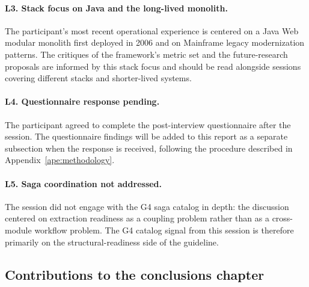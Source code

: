 \paragraph*{L3. Stack focus on Java and the long-lived monolith.} The participant's most recent operational experience is centered on a Java Web modular monolith first deployed in 2006 and on Mainframe legacy modernization patterns. The critiques of the framework's metric set and the future-research proposals are informed by this stack focus and should be read alongside sessions covering different stacks and shorter-lived systems.

\paragraph*{L4. Questionnaire response pending.} The participant agreed to complete the post-interview questionnaire after the session. The questionnaire findings will be added to this report as a separate subsection when the response is received, following the procedure described in Appendix~\ref{ape:methodology}.

\paragraph*{L5. Saga coordination not addressed.} The session did not engage with the G4 saga catalog in depth: the discussion centered on extraction readiness as a coupling problem rather than as a cross-module workflow problem. The G4 catalog signal from this session is therefore primarily on the structural-readiness side of the guideline.

\subsection*{Contributions to the conclusions chapter}

